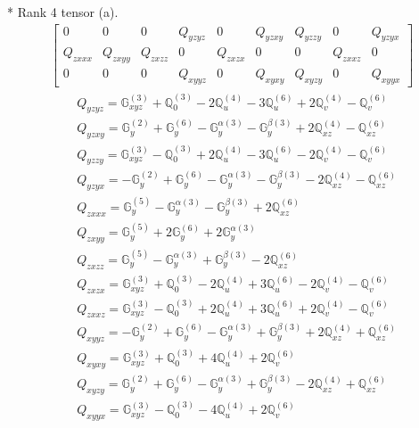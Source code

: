 \documentclass[fleqn,8pt,landscape]{jsarticle}
\begin{document}
* Rank 4 tensor (a).
\begin{align*}
\begin{bmatrix} 0 & 0 & 0 & Q_{yzyz} & 0 & Q_{yzxy} & Q_{yzzy} & 0 & Q_{yzyx} \\ Q_{zxxx} & Q_{zxyy} & Q_{zxzz} & 0 & Q_{zxzx} & 0 & 0 & Q_{zxxz} & 0 \\ 0 & 0 & 0 & Q_{xyyz} & 0 & Q_{xyxy} & Q_{xyzy} & 0 & Q_{xyyx} \end{bmatrix}
\end{align*}
\begin{align*}
& Q_{yzyz} = \mathbb{G}_{xyz}^{(3)} + \mathbb{Q}_{0}^{(3)} - 2 \mathbb{Q}_{u}^{(4)} - 3 \mathbb{Q}_{u}^{(6)} + 2 \mathbb{Q}_{v}^{(4)} - \mathbb{Q}_{v}^{(6)} \\
& Q_{yzxy} = \mathbb{G}_{y}^{(2)} + \mathbb{G}_{y}^{(6)} - \mathbb{G}_{y}^{\alpha(3)} - \mathbb{G}_{y}^{\beta(3)} + 2 \mathbb{Q}_{xz}^{(4)} - \mathbb{Q}_{xz}^{(6)} \\
& Q_{yzzy} = \mathbb{G}_{xyz}^{(3)} - \mathbb{Q}_{0}^{(3)} + 2 \mathbb{Q}_{u}^{(4)} - 3 \mathbb{Q}_{u}^{(6)} - 2 \mathbb{Q}_{v}^{(4)} - \mathbb{Q}_{v}^{(6)} \\
& Q_{yzyx} = - \mathbb{G}_{y}^{(2)} + \mathbb{G}_{y}^{(6)} - \mathbb{G}_{y}^{\alpha(3)} - \mathbb{G}_{y}^{\beta(3)} - 2 \mathbb{Q}_{xz}^{(4)} - \mathbb{Q}_{xz}^{(6)} \\
& Q_{zxxx} = \mathbb{G}_{y}^{(5)} - \mathbb{G}_{y}^{\alpha(3)} - \mathbb{G}_{y}^{\beta(3)} + 2 \mathbb{Q}_{xz}^{(6)} \\
& Q_{zxyy} = \mathbb{G}_{y}^{(5)} + 2 \mathbb{G}_{y}^{(6)} + 2 \mathbb{G}_{y}^{\alpha(3)} \\
& Q_{zxzz} = \mathbb{G}_{y}^{(5)} - \mathbb{G}_{y}^{\alpha(3)} + \mathbb{G}_{y}^{\beta(3)} - 2 \mathbb{Q}_{xz}^{(6)} \\
& Q_{zxzx} = \mathbb{G}_{xyz}^{(3)} + \mathbb{Q}_{0}^{(3)} - 2 \mathbb{Q}_{u}^{(4)} + 3 \mathbb{Q}_{u}^{(6)} - 2 \mathbb{Q}_{v}^{(4)} - \mathbb{Q}_{v}^{(6)} \\
& Q_{zxxz} = \mathbb{G}_{xyz}^{(3)} - \mathbb{Q}_{0}^{(3)} + 2 \mathbb{Q}_{u}^{(4)} + 3 \mathbb{Q}_{u}^{(6)} + 2 \mathbb{Q}_{v}^{(4)} - \mathbb{Q}_{v}^{(6)} \\
& Q_{xyyz} = - \mathbb{G}_{y}^{(2)} + \mathbb{G}_{y}^{(6)} - \mathbb{G}_{y}^{\alpha(3)} + \mathbb{G}_{y}^{\beta(3)} + 2 \mathbb{Q}_{xz}^{(4)} + \mathbb{Q}_{xz}^{(6)} \\
& Q_{xyxy} = \mathbb{G}_{xyz}^{(3)} + \mathbb{Q}_{0}^{(3)} + 4 \mathbb{Q}_{u}^{(4)} + 2 \mathbb{Q}_{v}^{(6)} \\
& Q_{xyzy} = \mathbb{G}_{y}^{(2)} + \mathbb{G}_{y}^{(6)} - \mathbb{G}_{y}^{\alpha(3)} + \mathbb{G}_{y}^{\beta(3)} - 2 \mathbb{Q}_{xz}^{(4)} + \mathbb{Q}_{xz}^{(6)} \\
& Q_{xyyx} = \mathbb{G}_{xyz}^{(3)} - \mathbb{Q}_{0}^{(3)} - 4 \mathbb{Q}_{u}^{(4)} + 2 \mathbb{Q}_{v}^{(6)}
\end{align*}
\end{document}
